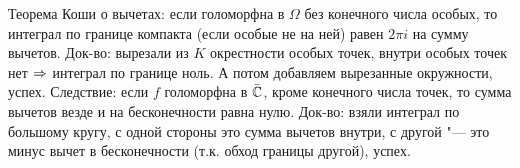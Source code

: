 	Теорема Коши о вычетах: если голоморфна в $\Omega$ без конечного числа особых, то
	интеграл по границе компакта (если особые не на ней) равен $2\pi i$ на сумму вычетов.
	Док-во: вырезали из $K$ окрестности особых точек, внутри особых точек нет $\Rightarrow$ интеграл по границе ноль.
	А потом добавляем вырезанные окружности, успех.
	Следствие: если $f$ голоморфна в $\bar {\mathbb{C}}$, кроме конечного числа точек,
	то сумма вычетов везде и на бесконечности равна нулю.
	Док-во: взяли интеграл по большому кругу, с одной стороны это сумма вычетов внутри,
	с другой "--- это минус вычет в бесконечности (т.к. обход границы другой), успех.

\section{} %
	\TODO

\section{} %
	\TODO

\section{} %
	\TODO

